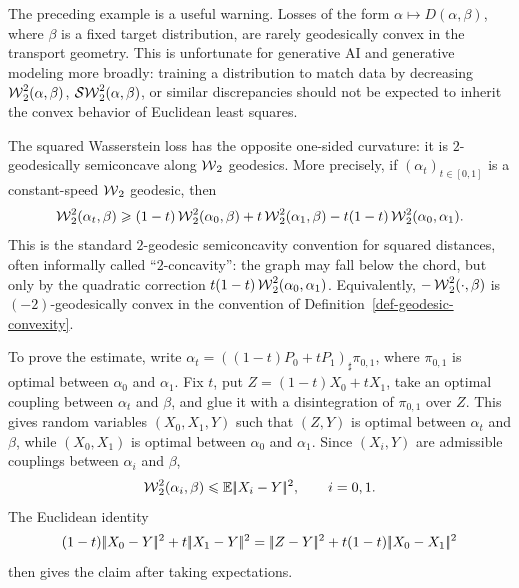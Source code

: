 \begin{rem}\label{rem-target-discrepancies-semiconcave}
	The preceding example is a useful warning. Losses of the form
	\(\alpha\mapsto D(\alpha,\beta)\), where \(\beta\) is a fixed target
	distribution, are rarely geodesically convex in the transport geometry. This is unfortunate for generative AI and generative modeling more broadly: training a distribution to match data by decreasing \(\operatorname{\mathcal{W}}_2^2(\alpha,\beta)\), \(\operatorname{\mathcal{SW}}_2^2(\alpha,\beta)\), or similar discrepancies should not be expected to inherit the convex behavior of Euclidean least squares.

	The squared Wasserstein loss has the opposite one-sided curvature: it is \(2\)-geodesically semiconcave along \(\operatorname{\mathcal{W}}_2\) geodesics. More precisely, if \((\alpha_t)_{t\in[0,1]}\) is a constant-speed \(\operatorname{\mathcal{W}}_2\) geodesic, then
	\[
		\operatorname{\mathcal{W}}_2^2(\alpha_t,\beta)
		\geqslant
		(1-t)\operatorname{\mathcal{W}}_2^2(\alpha_0,\beta)
		+
		t\operatorname{\mathcal{W}}_2^2(\alpha_1,\beta)
		-
		t(1-t)\operatorname{\mathcal{W}}_2^2(\alpha_0,\alpha_1).
	\]
	This is the standard \(2\)-geodesic semiconcavity convention for squared distances, often informally called ``\(2\)-concavity'': the graph may fall below the chord, but only by the quadratic correction \(t(1-t)\operatorname{\mathcal{W}}_2^2(\alpha_0,\alpha_1)\). Equivalently, \(-\operatorname{\mathcal{W}}_2^2(\cdot,\beta)\) is \((-2)\)-geodesically convex in the convention of Definition~\ref{def-geodesic-convexity}.

	To prove the estimate, write
	\(\alpha_t=((1-t)P_0+tP_1)_\sharp\pi_{0,1}\), where \(\pi_{0,1}\) is optimal between \(\alpha_0\) and \(\alpha_1\). Fix \(t\), put \(Z=(1-t)X_0+tX_1\), take an optimal coupling between \(\alpha_t\) and \(\beta\), and glue it with a disintegration of \(\pi_{0,1}\) over \(Z\). This gives random variables \((X_0,X_1,Y)\) such that \((Z,Y)\) is optimal between \(\alpha_t\) and \(\beta\), while \((X_0,X_1)\) is optimal between \(\alpha_0\) and \(\alpha_1\). Since \((X_i,Y)\) are admissible couplings between \(\alpha_i\) and \(\beta\),
	\[
		\operatorname{\mathcal{W}}_2^2(\alpha_i,\beta)\leqslant \mathbb{E}|\!| X_i-Y |\!|^2,
		\qquad i=0,1.
	\]
	The Euclidean identity
	\[
		(1-t)\norm{X_0-Y}^2+t\norm{X_1-Y}^2
		=
		\norm{Z-Y}^2+t(1-t)\norm{X_0-X_1}^2
	\]
	then gives the claim after taking expectations.


\end{rem}
